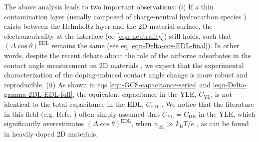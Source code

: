 \documentclass[journal=ancac3,manuscript=article,email=true,hyperref=true,keywords=true]{achemso}
\begin{document}
The above analysis leads to two important observations: (i) If a thin
contamination layer (usually composed of charge-neutral hydrocarbon
species \cite{li_effect_2013}) exists between the Helmholtz layer and
the 2D material surface, the electroneutrality at the interface (eq
\ref{eqn-neutrality}) still holds, such that \((\Delta \cos
\theta)^{\mathrm{EDL}}\) remains the same (see eq
\ref{eqn-Delta-cos-EDL-final}). In other words, despite the recent
debate about the role of the airborne adsorbates in the contact angle
measurement on 2D materials
\cite{li_effect_2013,Kozbial_2015,Xu_2013_withwhat,Chow_2015}, we expect
that the experimental characterization of the doping-induced contact
angle change is more robust and reproducible. (ii) As shown in eqs
\ref{eqn-GCS-capacitance-series} and \ref{eqn-Delta-gamma-2DL-EDL-full},
the equivalent capacitance in the YLE, \(C_{\mathrm{YL}}\), is not
identical to the total capacitance in the EDL, \(C_{\mathrm{EDL}}\). We
notice that the literature in this field (e.g. Refs.
)
often simply assumed that \(C_{\mathrm{YL}}=C_{\mathrm{DH}}\) in the
YLE, which significantly overestimates \((\Delta \cos
\theta)^{\mathrm{EDL}}\), when \(\psi_{\mathrm{2D}} \gg
k_{\mathrm{B}}T/e\) \cite{israelachvili03_inter}, as can be found in heavily-doped 2D materials. 
\end{document}
